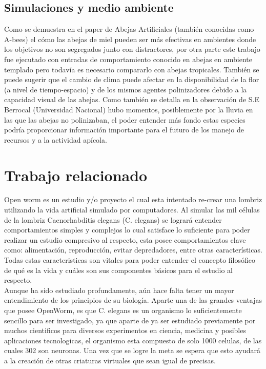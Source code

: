 \documentclass[conference]{IEEEtran}
\begin{document}
\subsection{Simulaciones y medio ambiente}
Como se demuestra en el paper de Abejas Artificiales (tambi\'en conocidas como A-bees) el c\'omo las abejas de miel pueden ser m\'as efectivas en ambientes donde los objetivos no son segregados junto con distractores, por otra parte este trabajo fue ejecutado con entradas de comportamiento conocido en abejas en ambiente templado pero todav\'ia es necesario compararlo con abejas tropicales.
Tambi\'en se puede sugerir que el cambio de clima puede afectar en la disponibilidad de la flor (a nivel de tiempo-espacio) y de los mismos agentes polinizadores debido a la capacidad visual de las abejas. Como tambi\'en se detalla en la observaci\'on de S.E Berrocal (Universidad Nacional) hubo momentos, posiblemente por la lluvia en las que las abejas no polinizaban, el poder entender m\'as fondo estas especies podr\'ia proporcionar informaci\'on importante para el futuro de los manejo de recursos y a la actividad ap\'icola. 


\section{Trabajo relacionado}

Open worm es un estudio y/o proyecto el cual esta intentado re-crear una lombriz utilizando la vida artificial simulado por computadores.  Al simular las mil c\'elulas de la lombriz Caenorhabditis elegans (C. elegans) se lograr\'a entender comportamientos simples y complejos lo cual satisface lo suficiente para poder realizar un estudio compresivo al respecto, esta posee comportamientos clave como: alimentaci\'on, reproducci\'on, evitar depredadores, entre otras caracter\'isticas. \cite{openworm} Todas estas caracteristicas son vitales para poder entender el concepto filos\'ofico de qu\'e es la vida y cu\'ales son sus componentes b\'asicos para el estudio al respecto. \\
Aunque ha sido estudiado profundamente, a\'un hace falta tener un mayor entendimiento de los principios de su biolog\'ia.
Aparte una de las grandes ventajas que posee OpenWorm, es que C. elegans es un organismo lo suficientemente sencillo para ser investigado, ya que aparte de ya ser estudiado previamente por muchos cient\’ificos para diversos experimentos en ciencia, medicina y posibles aplicaciones tecnol\’ogicas, el organismo est\’a compuesto de solo 1000 c\’elulas, de las cuales 302 son neuronas. 
Una vez que se logre la meta se espera que esto ayudar\'a a la creaci\'on de otras criaturas virtuales que sean igual de precisas.
\end{document}
